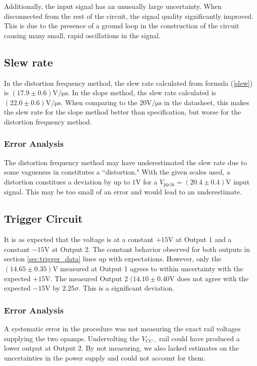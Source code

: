 \documentclass[11pt]{article}
\begin{document}
Additionally, the input signal has an unusually large uncertainty. When
disconnected from the rest of the circuit, the signal quality significantly 
improved. This is due to the presence of a ground loop in the construction of 
the circuit causing many small, rapid oscillations in the signal.

\subsection{Slew rate}

In the distortion frequency method, the slew rate calculated from formula 
(\ref{slew}) is 
$(17.9 \pm 0.6) \si{\volt / \micro\second}$. 
In the slope method, the slew rate calculated is
$(22.0 \pm 0.6) \si{\volt / \micro\second}$.
When comparing to the $20 \si{\volt / \micro\second}$ in the datasheet, this 
makes the slew rate for the slope method better than specification, but 
worse for the distortion frequency method.

\subsubsection{Error Analysis}

The distortion frequency method may have underestimated the slew rate due to 
some vagueness in constitutes a ``distortion." With the given scales used, 
a distortion constitues a deviation by up to $1 \si{\volt}$ for a 
$V_\text{pp,in} = (20.4 \pm 0.4) \si{\volt}$ input signal. This may be too 
small of an error and would lead to an underestimate.

\subsection{Trigger Circuit}

It is as expected that the voltage is at a constant 
$+15 \si{\volt}$ at Output 1 and a constant $-15 \si{\volt}$ at Output 2. 
The constant behavior observed for both outputs in section 
\ref{sec:trigger_data} lines up with expectations. However, only the 
$(14.65 \pm 0.35) \si{\volt}$ measured at Output 1 agrees to within 
uncertainty with the expected $+15 \si{\volt}$. The measured Output 2 
$(14.10 \pm 0.40 \si{\volt}$ does not agree with the expected $-15 \si{\volt}$
by $2.25 \sigma$. This is a significant deviation.


\subsubsection{Error Analysis}
A systematic error in the procedure was not measuring the exact rail voltages
supplying the two opamps. Undervolting the $V_{\text{CC}-}$ rail could have 
produced a lower output at Output 2. By not measuring, we also lacked estimates 
on the uncertainties in the power supply and could not account for them.
\end{document}
